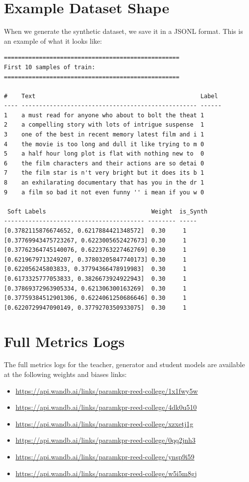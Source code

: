 \documentclass[11pt]{article}
\begin{document}
\section{Example Dataset Shape}
When we generate the synthetic dataset, we save it in a JSONL format.
This is an example of what it looks like:
\begin{verbatim}
==================================================
First 10 samples of train:
==================================================

#    Text                                               Label
---- -------------------------------------------------- ------
1    a must read for anyone who about to bolt the theat 1
2    a compelling story with lots of intrigue suspense  1
3    one of the best in recent memory latest film and i 1
4    the movie is too long and dull it like trying to m 0
5    a half hour long plot is flat with nothing new to  0
6    the film characters and their actions are so detai 0
7    the film star is n't very bright but it does its b 1
8    an exhilarating documentary that has you in the dr 1
9    a film so bad it not even funny '' i mean if you w 0

 Soft Labels                              Weight  is_Synth
---------------------------------------- -------- -----
[0.3782115876674652, 0.6217884421348572]  0.30     1
[0.37769943475723267, 0.6223005652427673] 0.30     1
[0.37762364745140076, 0.6223763227462769] 0.30     1
[0.6219679713249207, 0.37803205847740173] 0.30     1
[0.622056245803833, 0.37794366478919983]  0.30     1
[0.6173325777053833, 0.3826673924922943]  0.30     1
[0.37869372963905334, 0.621306300163269]  0.30     1
[0.37759384512901306, 0.6224061250686646] 0.30     1
[0.6220729947090149, 0.3779270350933075]  0.30     1

\end{verbatim}

\section{Full Metrics Logs}
The full metrics logs for the teacher, generator and student models
are available at the following
weights and biases links:
\begin{itemize}
  \item \url{https://api.wandb.ai/links/paramkpr-reed-college/1x1fwy5w}
  \item \url{https://api.wandb.ai/links/paramkpr-reed-college/4dk0u510}
  \item \url{https://api.wandb.ai/links/paramkpr-reed-college/xzxetj1g}
  \item \url{https://api.wandb.ai/links/paramkpr-reed-college/0qq2jnh3}
  \item \url{https://api.wandb.ai/links/paramkpr-reed-college/ynsp9i59}
  \item \url{https://api.wandb.ai/links/paramkpr-reed-college/w5i5m8gj}
\end{itemize}

\newpage


\end{document}
